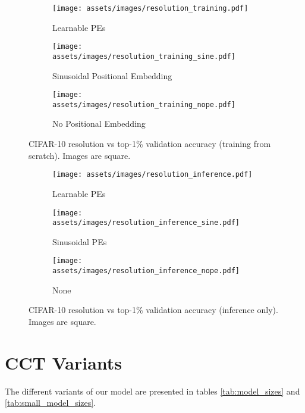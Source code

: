 \documentclass[10pt,twocolumn,letterpaper]{article}
\begin{document}
\begin{figure}[ht!]
     \centering
     \begin{subfigure}[b]{0.3\textwidth}
         \centering
         \texttt{[image: assets/images/resolution\_training.pdf]}
         \caption{Learnable PEs}
     \end{subfigure}
     \hfill
     \begin{subfigure}[b]{0.3\textwidth}
         \centering
         \texttt{[image: assets/images/resolution\_training\_sine.pdf]}
         \caption{Sinusoidal Positional Embedding}
     \end{subfigure}
     \hfill
     \begin{subfigure}[b]{0.3\textwidth}
         \centering
         \texttt{[image: assets/images/resolution\_training\_nope.pdf]}
         \caption{No Positional Embedding}
     \end{subfigure}
    \caption{CIFAR-10 resolution vs top-1\% validation accuracy (training from scratch). Images are square.}
    \label{fig:sizeruns_training}
\end{figure}

\begin{figure}[ht!]
     \centering
     \begin{subfigure}[b]{0.3\textwidth}
         \centering
         \texttt{[image: assets/images/resolution\_inference.pdf]}
         \caption{Learnable PEs}
     \end{subfigure}
     \hfill
     \begin{subfigure}[b]{0.3\textwidth}
         \centering
         \texttt{[image: assets/images/resolution\_inference\_sine.pdf]}
         \caption{Sinusoidal PEs}
     \end{subfigure}
     \hfill
     \begin{subfigure}[b]{0.3\textwidth}
         \centering
         \texttt{[image: assets/images/resolution\_inference\_nope.pdf]}
         \caption{None}
     \end{subfigure}
    \caption{CIFAR-10 resolution vs top-1\% validation accuracy (inference only). Images are square.}
    \label{fig:sizeruns_inference}
\end{figure}

\section{CCT Variants}
\label{appdx:model_variants}
The different variants of our model are presented in tables \ref{tab:model_sizes} and \ref{tab:small_model_sizes}.
\end{document}
